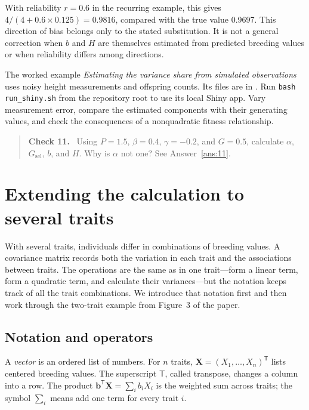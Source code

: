 \documentclass[11pt]{article}
\newcommand{\vect}[1]{\boldsymbol{#1}}
\newenvironment{checkpoint}[1]
  {\begin{quote}\small\noindent\textbf{Check #1.}\ }
  {\end{quote}}
\begin{document}
With reliability $r=0.6$ in the recurring example, this gives
$4/(4+0.6\times0.125)=0.9816$, compared with the true value 0.9697.  This
direction of bias belongs only to the stated substitution.  It is not a
general correction when $b$ and $H$ are themselves estimated from predicted
breeding values or when reliability differs among directions.

The worked example \emph{Estimating the variance share from simulated observations}
uses noisy height measurements and offspring counts. Its files are in
. Run \texttt{bash run\_shiny.sh} from
the repository root to use its local Shiny app. Vary measurement error, compare
the estimated components with their generating values, and check the consequences
of a nonquadratic fitness relationship.

\begin{checkpoint}{11}
Using $P=1.5$, $\beta=0.4$, $\gamma=-0.2$, and $G=0.5$, calculate $\alpha$,
$G_{\mathrm{sel}}$, $b$, and $H$.  Why is $\alpha$ not one?  See
Answer~\ref{ans:11}.
\end{checkpoint}

\section{Extending the calculation to several traits}
\label{sec:manytraits}

With several traits, individuals differ in combinations of breeding values. A covariance matrix records both the variation in each trait and the associations between traits. The operations are the same as in one trait---form a linear term, form a quadratic term, and calculate their variances---but the notation keeps track of all the trait combinations. We introduce that notation first and then work through the two-trait example from Figure~3 of the paper.

\subsection{Notation and operators}
\label{sec:multi-language}

A \emph{vector} is an ordered list of numbers.  For $n$ traits,
$\vect X=(X_1,\ldots,X_n)^{\mathsf T}$ lists centered breeding values.  The
superscript $\mathsf T$, called transpose, changes a column into a row.  The
product $\vect b^{\mathsf T}\vect X=\sum_i b_iX_i$ is the weighted sum across
traits; the symbol $\sum_i$ means add one term for every trait $i$.
\end{document}
